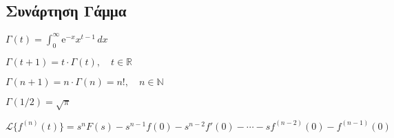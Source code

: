 {  \subsection*{Συνάρτηση Γάμμα}
  \begin{myitemize}
    \item $ \Gamma (t) = \int _{0}^{\infty} \mathrm{e}^{-x} x^{t-1} \,{dx} $
    \item $\Gamma (t+1) = t \cdot \Gamma (t), \quad t \in \mathbb{R} $
    \item $\Gamma (n+1) = n \cdot \Gamma (n) = n!, \quad n \in \mathbb{N}$
    \item $\Gamma \left({1}/{2}\right) = \sqrt{\pi}$
  \end{myitemize}
}
\begin{myitemize}
  \item $ \mathcal{L}\{f^{(n)}(t)\} = s^{n} F(s) - s^{n-1}f(0) - s^{n-2}f'(0) - 
    \cdots - sf^{(n-2)}(0)- f^{(n-1)}(0) $
\end{myitemize}



